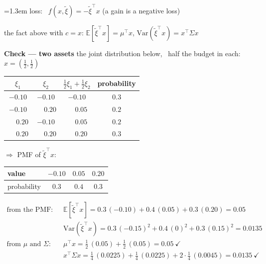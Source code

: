\documentclass[10pt]{article}
\newenvironment{board}{%
  \par\vspace{4pt}
  \begingroup\leftskip=1.3em\relax\parskip=2pt\relax}{%
  \par\endgroup\vspace{4pt}}
\begin{document}
\begin{board}
\quad loss: \ $f(x, \tilde\xi) = -\tilde\xi^{\top}x$ \qquad (a gain is a negative loss)
\vspace{6pt}

\quad the fact above with $c = x$: \qquad
$\mathbb{E}[\tilde\xi^{\top}x] = \mu^{\top}x$, \qquad $\mathrm{Var}(\tilde\xi^{\top}x) = x^{\top}\Sigma x$
\vspace{10pt}

\textbf{Check --- two assets} \quad the joint distribution below, \ half the budget in each: \ $x = (\tfrac12, \tfrac12)$
\vspace{4pt}

\begin{center}
\begin{tabular}{@{}cc|c|c@{}}
 $\xi_1$ & $\xi_2$ & $\tfrac12\xi_1 + \tfrac12\xi_2$ & probability \\ \hline
 $-0.10$ & $-0.10$ & $-0.10$ & $0.3$ \\
 $-0.10$ & $\phantom{-}0.20$ & $\phantom{-}0.05$ & $0.2$ \\
 $\phantom{-}0.20$ & $-0.10$ & $\phantom{-}0.05$ & $0.2$ \\
 $\phantom{-}0.20$ & $\phantom{-}0.20$ & $\phantom{-}0.20$ & $0.3$ \\
\end{tabular}
\qquad\quad $\Rightarrow$ \quad PMF of $\tilde\xi^{\top}x$: \quad
\begin{tabular}{@{}l|ccc@{}}
 value       & $-0.10$ & $0.05$ & $0.20$ \\ \hline
 probability & $0.3$   & $0.4$  & $0.3$  \\
\end{tabular}
\end{center}
\vspace{4pt}

\[
\begin{aligned}
\text{from the PMF:}\quad
 & \mathbb{E}[\tilde\xi^{\top}x] = 0.3\,(-0.10) + 0.4\,(0.05) + 0.3\,(0.20) = 0.05 \\
 & \mathrm{Var}(\tilde\xi^{\top}x) = 0.3\,(-0.15)^2 + 0.4\,(0)^2 + 0.3\,(0.15)^2 = 0.0135 \\[5pt]
\text{from $\mu$ and $\Sigma$:}\quad
 & \mu^{\top}x = \tfrac12\,(0.05) + \tfrac12\,(0.05) = 0.05 \ \checkmark \\
 & x^{\top}\Sigma x = \tfrac14\,(0.0225) + \tfrac14\,(0.0225) + 2 \cdot \tfrac14\,(0.0045) = 0.0135 \ \checkmark
\end{aligned}
\]
\vspace{2pt}


\end{board}
\end{document}
